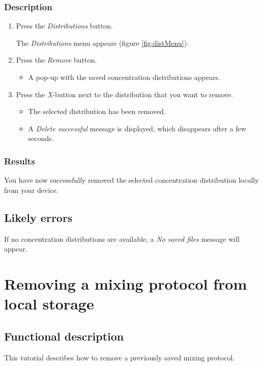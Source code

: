 \subsubsection{Description}
\begin{enumerate}
	\item Press the \emph{Distributions} button.
		\begin{itemize}
			The \emph{Distributions} menu appears (figure \ref{fig:distMenu}).
		\end{itemize}
	\item Press the \emph{Remove} button.
		\begin{itemize}
			\item A pop-up with the saved concentration distributions appears. 
		\end{itemize}
	\item Press the \emph{X}-button next to the distribution that you want to remove.
		\begin{itemize}
			\item The selected distribution has been removed.
			\item A \emph{Delete successful} message is displayed, which disappears after a few seconds.
		\end{itemize}
\end{enumerate}

\subsubsection{Results}
You have now successfully removed the selected concentration distribution locally from your device.

\subsection{Likely errors}
If no concentration distributions are available, a \emph{No saved files} message will appear.

\section{Removing a mixing protocol from local storage}
\label{sec:remmixprot}

\subsection{Functional description}
This tutorial describes how to remove a previously saved mixing protocol.

